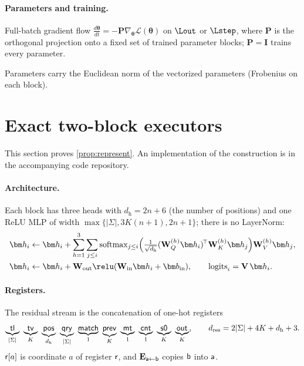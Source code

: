 \paragraph{Parameters and training.}

\begin{assumption}[Training]
\label{ass:gd}
Full-batch gradient flow $\tfrac{d\bm\theta}{dt}=-\mathbf P\nabla_{\bm\theta}\mathcal L(\bm\theta)$ on $\Lout$ or $\Lstep$, where $\mathbf P$ is the orthogonal
projection onto a fixed set of trained parameter blocks; $\mathbf P=\mathbf I$ trains every parameter.
\end{assumption}

\label{rem:norms}Parameters carry the Euclidean norm of the vectorized parameters (Frobenius on each block).


\section{Exact two-block executors}
\label{app:architectures}

This section proves \cref{prop:represent}. An implementation of the construction is in the accompanying code repository.

\paragraph{Architecture.}
\label{app:construction}
\label{app:model}
Each block has three heads with $d_{\mathrm h}=2n+6$ (the number of positions) and one ReLU MLP of width $\max\{|\Sigma|,3K(n+1),2n+1\}$;
there is no LayerNorm:
\begin{align*}
 \bm h_i&\leftarrow \bm h_i+\sum_{h=1}^{3}\sum_{j\le i}\operatorname{softmax}_{j\le i}\Bigl(\tfrac{1}{\sqrt{d_{\mathrm h}}}(\mathbf W^{(h)}_Q\bm h_i)^{\!\top}\mathbf W^{(h)}_K\bm h_j\Bigr)\mathbf W^{(h)}_V\bm h_j,\\
 \bm h_i&\leftarrow \bm h_i+\mathbf W_{\mathrm{out}}\relu(\mathbf W_{\mathrm{in}}\bm h_i+\bm b_{\mathrm{in}}),\qquad \mathrm{logits}_i=\mathbf V\,\bm h_i .
\end{align*}

\paragraph{Registers.} The residual stream is the concatenation of one-hot registers
\[
 \underbrace{\reg{tl}}_{|\Sigma|}\ \underbrace{\reg{tv}}_{K}\ \underbrace{\reg{pos}}_{d_{\mathrm h}}\ \underbrace{\reg{qry}}_{|\Sigma|}\ \underbrace{\reg{match}}_{1}\
 \underbrace{\reg{prev}}_{K}\ \underbrace{\reg{mt}}_{1}\ \underbrace{\reg{cnt}}_{1}\ \underbrace{\reg{s0}}_{K}\ \underbrace{\reg{out}}_{K},
 \qquad d_{\mathrm{res}}=2|\Sigma|+4K+d_{\mathrm h}+3 .
\]
$\mathsf{r}[a]$ is coordinate $a$ of register $\mathsf{r}$, and $\mathbf E_{\mathsf{a}\leftarrow\mathsf{b}}$ copies $\mathsf{b}$ into $\mathsf{a}$.

